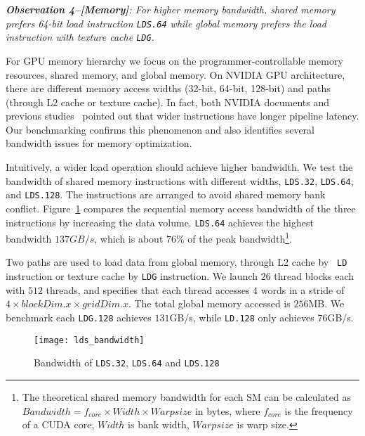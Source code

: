 {\em {\bf Observation 4--[Memory]}: For higher memory bandwidth, shared memory prefers 64-bit load
instruction {\tt LDS.64} while global memory prefers the load instruction with texture cache {\tt LDG}.}

For GPU memory hierarchy we focus on the programmer-controllable memory resources, shared memory, and global memory.
On NVIDIA GPU architecture, there are different memory access widths (32-bit, 64-bit, 128-bit) and paths (through L2
cache or texture cache).
In fact, both NVIDIA documents and previous studies~\cite{tan} pointed out that wider
instructions have longer pipeline latency.
Our benchmarking confirms this phenomenon and also identifies several bandwidth issues for memory optimization.

Intuitively, a wider load operation should achieve higher bandwidth.
We test the bandwidth of shared memory instructions with different widths, {\tt LDS.32}, {\tt LDS.64},
and {\tt LDS.128}.
The instructions are arranged to avoid shared memory bank conflict.
Figure~\ref{fig:lds_bw} compares the sequential memory access bandwidth of the three instructions by increasing the data volume.
{\tt LDS.64} achieves the highest bandwidth $137GB/s$, which is about $76\%$ of the peak bandwidth\footnote{The
theoretical shared memory bandwidth for each SM can be calculated as $Bandwidth = f_{core} \times Width \times Warpsize$ in
bytes, where $f_{core}$ is the frequency of a CUDA core, $Width$ is bank width, $Warpsize$ is warp size.}.

Two paths are used to load data from global memory, through L2 cache by {\tt
LD} instruction or texture cache by {\tt LDG} instruction.
We launch $26$ thread blocks each with $512$ threads, and specifies that each thread accesses $4$ words in a stride of $4 \times blockDim.x \times gridDim.x$.
The total global memory accessed is $256$MB.
We benchmark each {\tt LDG.128} achieves $131$GB/s, while {\tt LD.128} only achieves $76$GB/s.

\begin{figure}[htbp]
\begin{center}
\texttt{[image: lds\_bandwidth]}
    \caption{ Bandwidth of {\tt LDS.32}, {\tt LDS.64} and {\tt LDS.128}}
\label{fig:lds_bw}
\end{center}
\end{figure}

